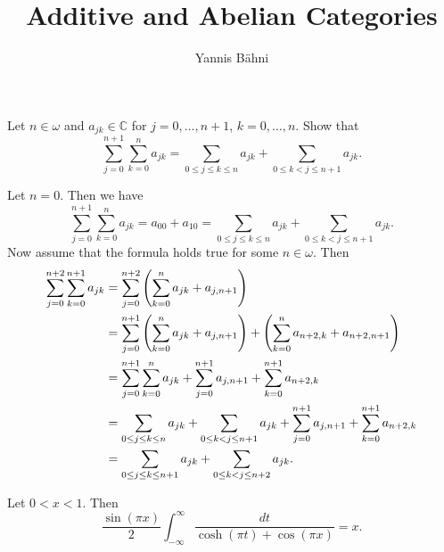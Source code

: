 

\title{Additive and Abelian Categories}
\author{Yannis B\"{a}hni}
\address[Yannis B\"{a}hni]{University of Zurich, R\"{a}mistrasse 71, 8006 Zurich}


\addtocounter{section}{1}

\begin{problem}
	Let $n \in \omega$ and $a_{jk} \in \mathbb{C}$ for $j = 0,\dots,n + 1$, $k = 0,\dots,n$. Show that
	\begin{equation*}
		\sum_{j = 0}^{n+1}\sum_{k = 0}^n a_{jk} = \sum_{0 \leq j \leq k \leq n}a_{jk} + \sum_{0 \leq k < j \leq n+1} a_{jk}.
	\end{equation*}
\end{problem}

\begin{solution}
	Let $n = 0$. Then we have
	\begin{equation*}
		\sum_{j = 0}^{n+1}\sum_{k = 0}^n a_{jk} = a_{00} + a_{10} =  \sum_{0 \leq j \leq k \leq n}a_{jk} + \sum_{0 \leq k < j \leq n+1} a_{jk}.
	\end{equation*}
	Now assume that the formula holds true for some $n \in \omega$. Then
	\begin{align*}
		\sum_{j = 0}^{n+2}\sum_{k = 0}^{n+1} a_{jk} &= \sum_{j = 0}^{n + 2}\del[4]{\sum_{k = 0}^n a_{jk} + a_{j,n+1}}\\
		&= \sum_{j = 0}^{n + 1}\del[4]{\sum_{k = 0}^n a_{jk} + a_{j,n+1}} + \del[4]{\sum_{k = 0}^n a_{n+2,k} + a_{n+2,n+1}}\\
		&= \sum_{j = 0}^{n + 1}\sum_{k = 0}^n a_{jk} + \sum_{j = 0}^{n + 1}a_{j,n+1} + \sum_{k = 0}^{n+1} a_{n+2,k}\\
		&= \sum_{0 \leq j \leq k \leq n}a_{jk} + \sum_{0 \leq k < j \leq n+1} a_{jk} + \sum_{j = 0}^{n + 1}a_{j,n+1} + \sum_{k = 0}^{n+1} a_{n+2,k}\\
		&= \sum_{0 \leq j \leq k \leq n + 1}a_{jk} + \sum_{0 \leq k < j \leq n+2} a_{jk}.
	\end{align*}
\end{solution}

\begin{problem}
	Let $0 < x < 1$. Then
	\begin{equation*}
		\frac{\sin( \pi x )}{2} \int_{-\infty}^\infty \frac{dt}{\cosh(\pi t ) + \cos( \pi x )} = x.
	\end{equation*}
\end{problem}

